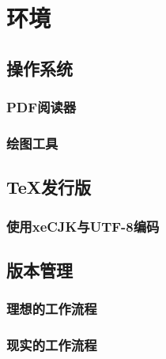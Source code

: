 \chapter{环境}


\section{操作系统}

\subsection{PDF阅读器}
\subsection{绘图工具}

\section{\TeX 发行版}
\subsection{使用xeCJK与UTF-8编码}

\section{版本管理}
\subsection{理想的工作流程}
\subsection{现实的工作流程}


